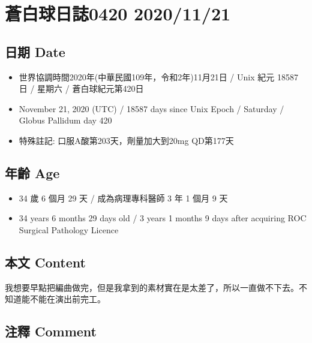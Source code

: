 \documentclass[
]{article}
\providecommand{\tightlist}{%
  \setlength{\itemsep}{0pt}\setlength{\parskip}{0pt}}
\begin{document}
\hypertarget{ux84bcux767dux7403ux65e5ux8a8c0420-20201121}{%
\section{蒼白球日誌0420
2020/11/21}\label{ux84bcux767dux7403ux65e5ux8a8c0420-20201121}}

\hypertarget{ux65e5ux671f-date-15}{%
\subsection{日期 Date}\label{ux65e5ux671f-date-15}}

\begin{itemize}
\tightlist
\item
  世界協調時間2020年(中華民國109年，令和2年)11月21日 / Unix 紀元 18587
  日 / 星期六 / 蒼白球紀元第420日
\item
  November 21, 2020 (UTC) / 18587 days since Unix Epoch / Saturday /
  Globus Pallidum day 420
\item
  特殊註記: 口服A酸第203天，劑量加大到20mg QD第177天
\end{itemize}

\hypertarget{ux5e74ux9f61-age-15}{%
\subsection{年齡 Age}\label{ux5e74ux9f61-age-15}}

\begin{itemize}
\tightlist
\item
  34 歲 6 個月 29 天 / 成為病理專科醫師 3 年 1 個月 9 天
\item
  34 years 6 months 29 days old / 3 years 1 months 9 days after
  acquiring ROC Surgical Pathology Licence
\end{itemize}

\hypertarget{ux672cux6587-content-15}{%
\subsection{本文 Content}\label{ux672cux6587-content-15}}

我想要早點把編曲做完，但是我拿到的素材實在是太差了，所以一直做不下去。不知道能不能在演出前完工。

\hypertarget{ux6ce8ux91cb-comment-15}{%
\subsection{注釋 Comment}\label{ux6ce8ux91cb-comment-15}}
\end{document}
